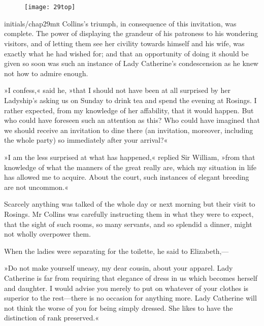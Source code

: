 \chapter[Chapter \thechapter]{}
	
\begin{figure}[t!]
\centering
\texttt{[image: 29top]}
\end{figure}


\lettrine[lines=6,image=true]{initials/chap29m}{r}  Collins's triumph, in consequence of this invitation, was complete. The power of displaying the grandeur of his patroness to his wondering visitors, and of letting them see her civility towards himself and his wife, was exactly what he had wished for; and that an opportunity of doing it should be given so soon was such an instance of Lady Catherine's condescension as he knew not how to admire enough.

»I confess,« said he, »that I should not have been at all surprised by her Ladyship's asking us on Sunday to drink tea and spend the evening at Rosings. I rather expected, from my knowledge of her affability, that it would happen. But who could have foreseen such an attention as this? Who could have imagined that we should receive an invitation to dine there (an invitation, moreover, including the whole party) so immediately after your arrival?«

»I am the less surprised at what has happened,« replied Sir William, »from that knowledge of what the manners of the great really are, which my situation in life has allowed me to acquire. About the court, such instances of elegant breeding are not uncommon.«

Scarcely anything was talked of the whole day or next morning but their visit to Rosings. Mr Collins was carefully instructing them in what they were to expect, that the sight of such rooms, so many servants, and so splendid a dinner, might not wholly overpower them.

When the ladies were separating for the toilette, he said to Eliz\-a\-beth,—

»Do not make yourself uneasy, my dear cousin, about your apparel. Lady Catherine is far from requiring that elegance of dress in us which becomes herself and daughter. I would advise you merely to put on whatever of your clothes is superior to the rest—there is no occasion for anything more. Lady Catherine will not think the worse of you for being simply dressed. She likes to have the distinction of rank preserved.«

